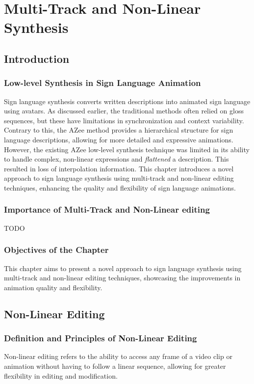 \chapter{Multi-Track and Non-Linear Synthesis}

\section{Introduction}
\subsection{Low-level Synthesis in Sign Language Animation}
Sign language synthesis converts written descriptions into animated sign language using avatars. As discussed earlier, the traditional methods often relied on gloss sequences, but these have limitations in synchronization and context variability. Contrary  to this, the AZee method provides a hierarchical structure for sign language descriptions, allowing for more detailed and expressive animations. However, the existing AZee low-level synthesis technique was limited in its ability to handle complex, non-linear expressions and \emph{flattened} a description. This resulted in loss of interpolation information. This chapter introduces a novel approach to sign language synthesis using multi-track and non-linear editing techniques, enhancing the quality and flexibility of sign language animations.

\subsection{Importance of Multi-Track and Non-Linear editing}
TODO

\subsection{Objectives of the Chapter}
This chapter aims to present a novel approach to sign language synthesis using multi-track and non-linear editing techniques, showcasing the improvements in animation quality and flexibility.

\section{Non-Linear Editing}
\subsection{Definition and Principles of Non-Linear Editing}
Non-linear editing refers to the ability to access any frame of a video clip or animation without having to follow a linear sequence, allowing for greater flexibility in editing and modification.

